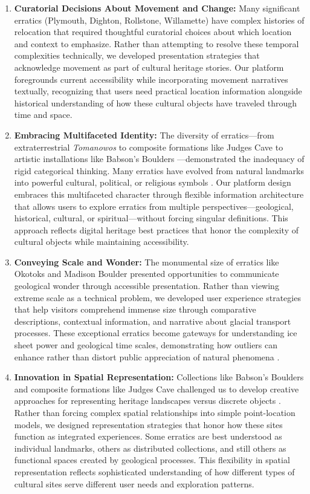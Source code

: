 \begin{enumerate}
    \item \textbf{Curatorial Decisions About Movement and Change:} Many significant erratics (Plymouth, Dighton, Rollstone, Willamette) have complex histories of relocation that required thoughtful curatorial choices about which location and context to emphasize. Rather than attempting to resolve these temporal complexities technically, we developed presentation strategies that acknowledge movement as part of cultural heritage stories. Our platform foregrounds current accessibility while incorporating movement narratives textually, recognizing that users need practical location information alongside historical understanding of how these cultural objects have traveled through time and space.
    \item \textbf{Embracing Multifaceted Identity:} The diversity of erratics—from extraterrestrial \emph{Tomanowos} \cite{AMNHWillamette, Pasek2008} to composite formations like Judges Cave \cite{Dana1891} to artistic installations like Babson's Boulders \cite{Moore2005}—demonstrated the inadequacy of rigid categorical thinking. Many erratics have evolved from natural landmarks into powerful cultural, political, or religious symbols \cite{Seelye1997, Lenik2009, googleLewistonEvening, Stiles1794}. Our platform design embraces this multifaceted character through flexible information architecture that allows users to explore erratics from multiple perspectives—geological, historical, cultural, or spiritual—without forcing singular definitions. This approach reflects digital heritage best practices that honor the complexity of cultural objects while maintaining accessibility.
    \item \textbf{Conveying Scale and Wonder:} The monumental size of erratics like Okotoks and Madison Boulder \cite{AlbertaOkotoks, NHMadisonBoulder} presented opportunities to communicate geological wonder through accessible presentation. Rather than viewing extreme scale as a technical problem, we developed user experience strategies that help visitors comprehend immense size through comparative descriptions, contextual information, and narrative about glacial transport processes. These exceptional erratics become gateways for understanding ice sheet power and geological time scales, demonstrating how outliers can enhance rather than distort public appreciation of natural phenomena \cite{Cuffey2010}.
    \item \textbf{Innovation in Spatial Representation:} Collections like Babson's Boulders and composite formations like Judges Cave challenged us to develop creative approaches for representing heritage landscapes versus discrete objects \cite{wburMysteriousBoulders, Dana1891}. Rather than forcing complex spatial relationships into simple point-location models, we designed representation strategies that honor how these sites function as integrated experiences. Some erratics are best understood as individual landmarks, others as distributed collections, and still others as functional spaces created by geological processes. This flexibility in spatial representation reflects sophisticated understanding of how different types of cultural sites serve different user needs and exploration patterns.

\end{enumerate}
